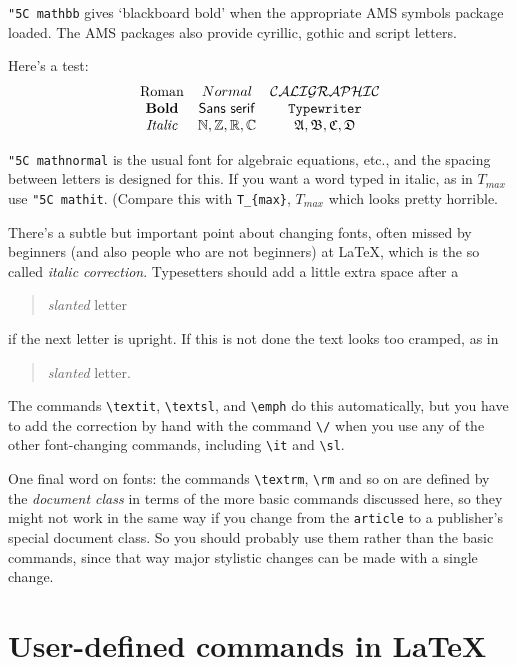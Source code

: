 \documentclass[11pt,a4paper]{article}
\newcommand{\cn}[1]{{\tt \char"5C #1}}
\begin{document}
\cn{mathbb} gives `blackboard bold' when the appropriate AMS
symbols package loaded.  The AMS packages also provide
cyrillic, gothic and script letters.

Here's a test: 
\[\begin{array}{ccc}
\mathrm{Roman} & \mathnormal{Normal} & \mathcal{CALIGRAPHIC} \\
\mathbf{Bold} & \mathsf{Sans\ serif} & \mathtt{Typewriter} \\
\mathit{Italic} & \mathbb{N,Z,R,C} & \mathfrak{A,B,C,D}
\end{array}\]

\cn{mathnormal} is the usual font for algebraic equations, etc.,
and the spacing between letters is designed for this.  If you want a
word typed in italic, as in \( T_{\mathit{max}} \) use \cn{mathit}.
(Compare this with \verb|T_{max}|, \( T_{max} \) which looks pretty
horrible.

There's a subtle but important point about changing fonts, often 
missed by beginners (and also people who are not beginners) at
\LaTeX, which is the so called \textit{italic correction}.
Typesetters should add a little extra space after a 
\begin{quote}
{\sl slanted\/} letter
\end{quote} 
if the next letter is upright.  If this is not done
the text looks too cramped, as in
\begin{quote}
{\sl slanted} letter.  
\end{quote}
The commands \verb|\textit|, \verb|\textsl|, and \verb|\emph| do 
this automatically, but you have to add the correction by hand with 
the command \verb|\/| when you use any of the other font-changing 
commands, including \verb|\it| and \verb|\sl|.

One final word on fonts: the commands \verb|\textrm|, \verb|\rm|
and so on are defined by the \textit{document class} in terms
of the more basic commands discussed here, so they might not work
in the same way if you change from the \verb|article| to a publisher's
special document class.  So you should probably use them rather
than the basic commands, since that way major stylistic changes can be
made with a single change.

\section{User-defined commands in \LaTeX}

\newcommand{\wake}{baba\-badalgharagh\-takam\-min\-%
arron\-nkonn\-bronn\-tonn\-er\-ronn\-tuonn\-thunn\-%
tro\-varr\-houn\-awnskawn\-too\-hoo\-hoor\-denen\-thur\-nuk}
\end{document}
